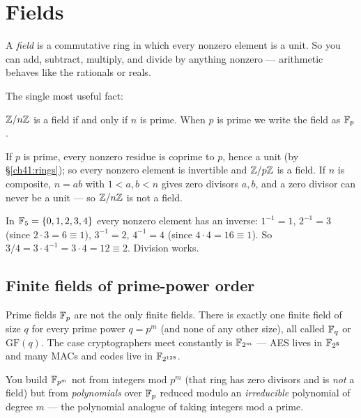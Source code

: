 \section{Fields}
\label{ch41:fields}

\begin{definition}[Field]
\label{ch41:def-field}
A \emph{field} is a commutative ring in which every nonzero element is a unit. So
you can add, subtract, multiply, and divide by anything nonzero --- arithmetic
behaves like the rationals or reals.
\end{definition}

The single most useful fact:

\begin{theorem}
\label{ch41:thm-fp}
$\mathbb{Z}/n\mathbb{Z}$ is a field if and only if $n$ is prime. When $p$ is prime we write the
field as $\mathbb{F}_p$.
\end{theorem}

If $p$ is prime, every nonzero residue is coprime to $p$, hence a unit (by
\S\ref{ch41:rings}); so every nonzero element is invertible and $\mathbb{Z}/p\mathbb{Z}$ is a
field. If $n$ is composite, $n=ab$ with $1<a,b<n$ gives zero divisors $a,b$, and a
zero divisor can never be a unit --- so $\mathbb{Z}/n\mathbb{Z}$ is not a field.

\begin{example}[$\F_5$ by hand]
\label{ch41:ex-f5}
In $\mathbb{F}_5=\{0,1,2,3,4\}$ every nonzero element has an inverse: $1^{-1}=1$,
$2^{-1}=3$ (since $2\cdot3=6\equiv1$), $3^{-1}=2$, $4^{-1}=4$ (since $4\cdot4=16
\equiv1$). So $3/4 = 3\cdot 4^{-1} = 3\cdot 4 = 12 \equiv 2$. Division works.
\end{example}

\subsection{Finite fields of prime-power order}
\label{ch41:gf}

Prime fields $\mathbb{F}_p$ are not the only finite fields. There is exactly one finite
field of size $q$ for every prime power $q=p^m$ (and none of any other size), all
called $\mathbb{F}_q$ or $\mathrm{GF}(q)$. The case cryptographers meet constantly is
$\mathbb{F}_{2^m}$ --- AES lives in $\mathbb{F}_{2^8}$ and many MACs and codes live in
$\mathbb{F}_{2^{128}}$.

You build $\mathbb{F}_{p^m}$ not from integers mod $p^m$ (that ring has zero divisors and
is \emph{not} a field) but from \emph{polynomials} over $\mathbb{F}_p$ reduced modulo an
\emph{irreducible} polynomial of degree $m$ --- the polynomial analogue of taking
integers mod a prime.

